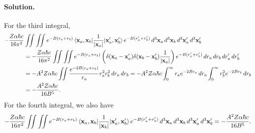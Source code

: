 \documentclass[11pt]{article}
\newcommand{\beq}{\begin{equation*}}
\newcommand{\eeq}{\end{equation*}}
\newenvironment{solution}
{
    \paragraph{Solution.}
    \ignorespaces
}
{
}
\begin{document}
\begin{solution}
	For the third integral,
	\begin{align*}
		-\frac{Z \alpha \hbar c}{16\pi^2} &\iint \iint e^{-B(r_a + r_b)} \mel{\vb{x}_a, \vb{x}_b}{\frac{1}{\abs{\vb{x}_a}}}{\vb{x}_a', \vb{x}_b'} e^{-B(r_a' + r_b')} \dd[3]{\vb{x}_a} \dd[3]{\vb{x}_b} \dd[3]{\vb{x}_a'} \dd[3]{\vb{x}_b'} \\
		&= -\frac{Z \alpha \hbar c}{16\pi^2}\iint \iint e^{-B(r_a + r_b)} \left( \delta(\vb{x}_a - \vb{x}_a') \delta(\vb{x}_b - \vb{x}_b') \frac{1}{\abs{\vb{x}_a}} \right) e^{-B(r_a' + r_b')} \dd{r_a} \dd{r_b} \dd{r_a'} \dd{r_b'} \\
		&= -A^2 Z \alpha \hbar c \iint \frac{e^{-2B(r_a + r_b)}}{r_a} r_a^2 r_b^2 \dd{r_a} \dd{r_b}
		= -A^2 Z \alpha \hbar c \int_0^\infty r_a e^{-2 B r_a} \dd{r_a} \int_0^\infty r_b^2 e^{-2 B r_b} \dd{r_b} \\
		&= -\frac{A^2 Z \alpha \hbar c}{16 B^5}.
	\end{align*}
	For the fourth integral, we also have
	\beq
		-\frac{Z \alp \hbar c}{16\pi^2} \iint \iint e^{-B(\ra + \rb)} \mel{\vxa, \vxb}{\frac{1}{\abs{\vxb}}}{\vxa', \vxb'} e^{-B(\ra' + \rb')} \dcxa \dcxb \dcxap \dcxbp = -\frac{A^2 Z \alp \hbar c}{16 B^5}.
	\eeq
	

\end{solution}
\end{document}
